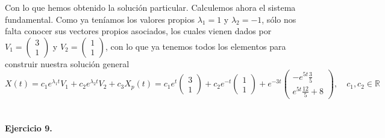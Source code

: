 \documentclass[fleqn]{article}
\def\R{\mathds{R}}
\begin{document}
    Con lo que hemos obtenido la solución particular. Calculemos ahora el sistema fundamental. Como ya teníamos los valores propios $\lambda_1=1$ y $\lambda_2=-1$, sólo nos falta conocer
    sus vectores propios asociados, los cuales vienen dados por $V_1 = \begin{pmatrix} 3\\1 \end{pmatrix}$ y $V_2 = \begin{pmatrix} 1\\1 \end{pmatrix}$, con lo que ya tenemos todos los elementos
    para construir nuestra solución general
    $$X(t) = c_1e^{\lambda_1 t}V_1 + c_2e^{\lambda_2 t}V_2 + c_3X_p(t) = c_1e^{t}\begin{pmatrix} 3\\1 \end{pmatrix} + c_2e^{-t} \begin{pmatrix} 1\\1 \end{pmatrix} + 
    e^{-3t}\begin{pmatrix}-e^{5t}\frac{3}{5} \\e^{5t}\frac{12}{5}+8\end{pmatrix}, \quad c_1,c_2 \in \R$$\\ \\

    \textbf{Ejercicio 9. } \\
    
\end{document}
